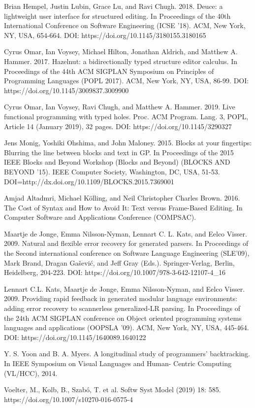 \documentclass[runningheads]{llncs}
\begin{document}
\begin{thebibliography}{88}
Brian Hempel, Justin Lubin, Grace Lu, and Ravi Chugh. 2018. Deuce: a lightweight user interface for structured editing. In Proceedings of the 40th International Conference on Software Engineering (ICSE '18). ACM, New York, NY, USA, 654-664. DOI: https://doi.org/10.1145/3180155.3180165

Cyrus Omar, Ian Voysey, Michael Hilton, Jonathan Aldrich, and Matthew A. Hammer. 2017. Hazelnut: a bidirectionally typed structure editor calculus. In Proceedings of the 44th ACM SIGPLAN Symposium on Principles of Programming Languages (POPL 2017). ACM, New York, NY, USA, 86-99. DOI: https://doi.org/10.1145/3009837.3009900

Cyrus Omar, Ian Voysey, Ravi Chugh, and Matthew A. Hammer. 2019. Live functional programming with typed holes. Proc. ACM Program. Lang. 3, POPL, Article 14 (January 2019), 32 pages. DOI: https://doi.org/10.1145/3290327

Jens Monig, Yoshiki Ohshima, and John Maloney. 2015. Blocks at your fingertips: Blurring the line between blocks and text in GP. In Proceedings of the 2015 IEEE Blocks and Beyond Workshop (Blocks and Beyond) (BLOCKS AND BEYOND '15). IEEE Computer Society, Washington, DC, USA, 51-53. DOI=http://dx.doi.org/10.1109/BLOCKS.2015.7369001

Amjad Altadmri, Michael Kölling, and Neil Christopher Charles Brown. 2016. The Cost of Syntax and How to Avoid It: Text versus Frame-Based Editing. In Computer Software and Applications Conference (COMPSAC).

Maartje de Jonge, Emma Nilsson-Nyman, Lennart C. L. Kats, and Eelco Visser. 2009. Natural and flexible error recovery for generated parsers. In Proceedings of the Second international conference on Software Language Engineering (SLE'09), Mark Brand, Dragan Gašević, and Jeff Gray (Eds.). Springer-Verlag, Berlin, Heidelberg, 204-223. DOI: https://doi.org/10.1007/978-3-642-12107-4\_16 

Lennart C.L. Kats, Maartje de Jonge, Emma Nilsson-Nyman, and Eelco Visser. 2009. Providing rapid feedback in generated modular language environments: adding error recovery to scannerless generalized-LR parsing. In Proceedings of the 24th ACM SIGPLAN conference on Object oriented programming systems languages and applications (OOPSLA '09). ACM, New York, NY, USA, 445-464. DOI: https://doi.org/10.1145/1640089.1640122

Y. S. Yoon and B. A. Myers. A longitudinal study of programmers’ backtracking. In IEEE Symposium on Visual Languages and Human- Centric Computing (VL/HCC), 2014.

Voelter, M., Kolb, B., Szabó, T. et al. Softw Syst Model (2019) 18: 585. https://doi.org/10.1007/s10270-016-0575-4

\end{thebibliography}
\end{document}
